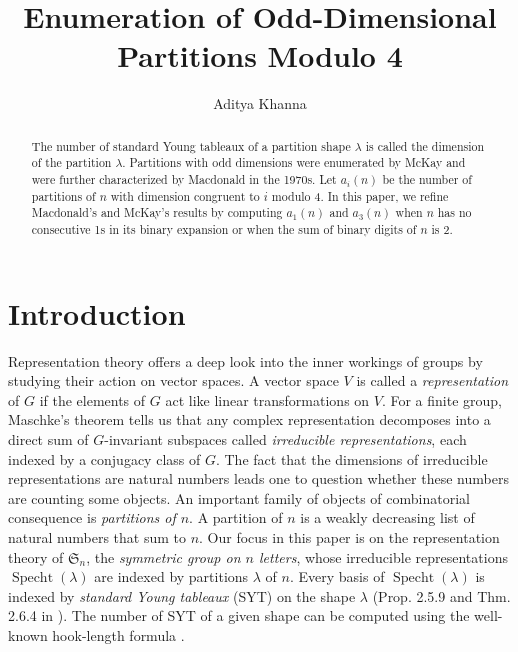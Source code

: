 \documentclass[12pt]{amsart}
\title{Enumeration of Odd-Dimensional Partitions Modulo 4}%
\author{Aditya Khanna}
\date{}
\theoremstyle{definition}
\numberwithin{equation}{section}
\newcommand{\la}{\lambda}
\renewcommand{\SS}{\mathfrak{S}}
\DeclareMathOperator{\specht}{Specht}
\begin{document}


{\let\newpage\relax\maketitle}

\begin{abstract}
The number of standard Young tableaux of a partition shape $\lambda$ is called the dimension of the partition $\la$. Partitions with odd dimensions were enumerated by McKay and were further characterized by Macdonald in the 1970s. Let $a_i(n)$ be the number of partitions of $n$ with dimension congruent to $i$ modulo 4. In this paper, we refine Macdonald's and McKay's results by computing $a_1(n)$ and $a_3(n)$ when $n$ has no consecutive 1s in its binary expansion or when the sum of binary digits of $n$ is 2.
\end{abstract}





\section{Introduction}\label{sec:introduction}
Representation theory offers a deep look into the inner workings of groups by studying their action on vector spaces. A vector space $V$ is called a \textit{representation} of $G$ if the elements of $G$ act like linear transformations on $V$. For a finite group, Maschke's theorem tells us that any complex representation decomposes into a direct sum of $G$-invariant subspaces called \textit{irreducible representations}, each indexed by a conjugacy class of $G$. The fact that the dimensions of irreducible representations are natural numbers leads one to question whether these numbers are counting some objects. An important family of objects of combinatorial consequence is \textit{partitions of $n$}. A partition of $n$ is a weakly decreasing list of natural numbers that sum to $n$.
Our focus in this paper is on the representation theory of $\SS_n$, the \textit{symmetric group on $n$ letters}, whose irreducible representations $\specht(\la)$ are indexed by partitions $\la$ of $n$. Every basis of $\specht(\la)$ is indexed by \textit{standard Young tableaux} (SYT) on the shape $\la$ (Prop. 2.5.9 and Thm. 2.6.4 in \cite{sagan}). The number of SYT of a given shape can be computed using the well-known hook-length formula \cite{frthook}.
\end{document}

